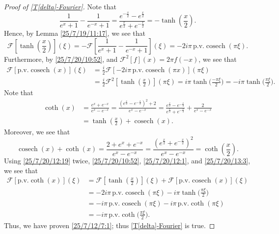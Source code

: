 \documentclass{amsart}
\numberwithin{equation}{section}
\newcommand{\pv}{\textrm{p.v.}}
\begin{document}
\begin{proof}[Proof of \eqref{T[delta]-Fourier}]
Note that 
\[ \frac{1}{e^{x}+1} - \frac{1}{e^{-x}+1}=\frac{e^{-\frac{x}{2}}-e^{\frac{x}{2}}}{e^{\frac{x}{2}}+e^{-\frac{x}{2}}}=-\tanh{\left( \frac{x}{2}\right)}.\]
Hence, by Lemma \ref{25/7/19/11:17}, we see that 
\begin{equation}\label{25/7/20/10:52}
\mathcal{F}\left[ \tanh{\left(\frac{x}{2}\right)} \right]\left(\xi \right)
=-\mathcal{F}\left[ \frac{1}{e^{x}+1} - \frac{1}{e^{-x}+1}\right]\left( \xi\right)=-2i \pi\, \pv\operatorname{cosech}{\left( \pi \xi \right)}.
\end{equation}
Furthermore, by \eqref{25/7/20/10:52}, and $\mathcal{F}^{2}[f](x) = 2\pi f(-x)$, we see that 
\begin{equation}\label{25/7/20/12:1}
\begin{aligned}
\mathcal{F}\left[ \pv\operatorname{cosech}{\left( x \right)}\right](\xi) 
&=\frac{i}{2}\mathcal{F}\left[ -2 i \pi\, \pv\operatorname{cosech}{\left(\pi x \right)}\right]\left(\pi \xi \right)\\
&= \frac{i}{2}\mathcal{F}^{2}\left[ \tanh{\left(\frac{x}{2}\right)} \right]\left(\pi \xi\right)=i\pi \tanh{\Big( \frac{-\pi \xi}{2}\Big)}=-i\pi \tanh{\Big( \frac{\pi \xi}{2}\Big)}.
\end{aligned} 
\end{equation}
Note that 
\begin{equation}\label{25/7/20/12:19}
\begin{aligned}
\coth{(x)} 
&=\frac{e^{x}+e^{-x}}{e^{x}-e^{-x}}=\frac{(e^{\frac{x}{2}} - e^{-\frac{x}{2}})^{2} + 2}{e^{x}-e^{-x}}=\frac{e^{\frac{x}{2}} - e^{-\frac{x}{2}}}{e^{\frac{x}{2}}+ e^{-\frac{x}{2}}}+\frac{2}{ e^{x}- e^{-x}}\\
&=\tanh{\left(\frac{x}{2} \right)} + \operatorname{cosech}{(x)}.
\end{aligned}
\end{equation}
Moreover, we see that 
\begin{equation}\label{25/7/20/13:3}
\operatorname{cosech}{\left(x \right)} + \coth{(x)}
=\frac{2+ e^{x} + e^{-x}}{e^{x}- e^{-x}}= \frac{(e^{\frac{x}{2}} + e^{-\frac{x}{2}})^{2}}{e^{x}-e^{-x}}=\coth{\left( \frac{x}{2}\right)}. 
\end{equation}
Using \eqref{25/7/20/12:19} twice, 
 \eqref{25/7/20/10:52}, \eqref{25/7/20/12:1}, and 
 \eqref{25/7/20/13:3}, we see that
\begin{equation}\label{25/7/20/12:55}
\begin{aligned} 
\mathcal{F}\left[\pv \coth{(x)}\right](\xi) 
&=\mathcal{F}\left[ \tanh{\left(\frac{x}{2} \right)}\right](\xi) + \mathcal{F}\left[\pv\operatorname{cosech}{(x)}\right](\xi)\\
&=-2i \pi\, \pv\operatorname{cosech}{\left( \pi \xi \right)}-i\pi \tanh{\Big( \frac{\pi \xi}{2}\Big)}\\
&=-i \pi\, \pv\operatorname{cosech}{\left( \pi \xi \right)}-i\pi\,\pv \coth{(\pi \xi)}\\
&=-i\pi\,\pv \coth{\Big( \frac{\pi \xi}{2} \Big)}.
\end{aligned}
\end{equation}
Thus, we have proven \eqref{25/7/12/7:1}; thus \eqref{T[delta]-Fourier} is true. 
\end{proof}
\end{document}
